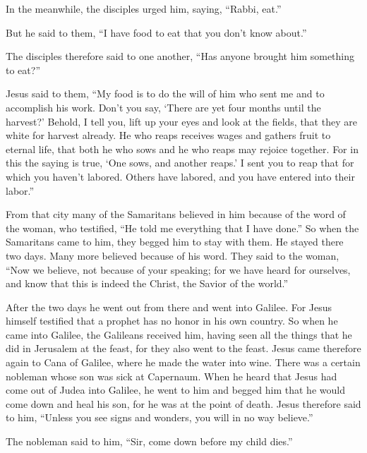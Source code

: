  In the meanwhile, the disciples urged him, saying,
``Rabbi, eat.''

 But he said to them, ``I have food to eat that you don't
know about.''

 The disciples therefore said to one another, ``Has
anyone brought him something to eat?''

 Jesus said to them, ``My food is to do the will of him
who sent me and to accomplish his work.  Don't you say,
`There are yet four months until the harvest?' Behold, I tell you, lift
up your eyes and look at the fields, that they are white for harvest
already.  He who reaps receives wages and gathers fruit
to eternal life, that both he who sows and he who reaps may rejoice
together.  For in this the saying is true, `One sows, and
another reaps.'  I sent you to reap that for which you
haven't labored. Others have labored, and you have entered into their
labor.''

 From that city many of the Samaritans believed in him
because of the word of the woman, who testified, ``He told me everything
that I have done.''  So when the Samaritans came to him,
they begged him to stay with them. He stayed there two days.
 Many more believed because of his word. 
They said to the woman, ``Now we believe, not because of your speaking;
for we have heard for ourselves, and know that this is indeed the
Christ, the Savior of the world.''

 After the two days he went out from there and went into
Galilee.  For Jesus himself testified that a prophet has
no honor in his own country.  So when he came into
Galilee, the Galileans received him, having seen all the things that he
did in Jerusalem at the feast, for they also went to the feast.
 Jesus came therefore again to Cana of Galilee, where he
made the water into wine. There was a certain nobleman whose son was
sick at Capernaum.  When he heard that Jesus had come out
of Judea into Galilee, he went to him and begged him that he would come
down and heal his son, for he was at the point of death. 
Jesus therefore said to him, ``Unless you see signs and wonders, you
will in no way believe.''

 The nobleman said to him, ``Sir, come down before my
child dies.''

